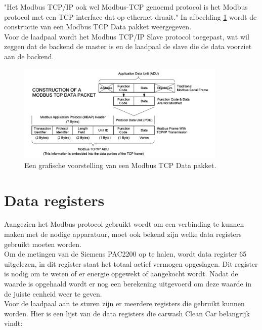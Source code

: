 "Het Modbus TCP/IP ook wel Modbus-TCP genoemd protocol is het Modbus protocol met een TCP interface dat op ethernet draait." \autocite{Acromag2005} In afbeelding \ref{fig:modbus-data-pakket} wordt de constructie van een Modbus TCP Data pakket weergegeven.\\

Voor de laadpaal wordt het Modbus TCP/IP Slave protocol toegepast, wat wil zeggen dat de backend de master is en de laadpaal de slave die de data voorziet aan de backend.

\begin{figure}[h]
    \includegraphics[width=10cm]{./graphics/Modbus-TCP-schema.png}
    \caption{Een grafische voorstelling van een Modbus TCP Data pakket. \autocite{Acromag2005}}
    \label{fig:modbus-data-pakket}
\end{figure}

\section{Data registers}
\label{sec:stand-van-zaken-dataregisters}

Aangezien het Modbus protocol gebruikt wordt om een verbinding te kunnen maken met de nodige apparatuur, moet ook bekend zijn welke data registers gebruikt moeten worden.\\

Om de metingen van de Siemens PAC2200 op te halen, wordt data register 65 uitgelezen, in dit register staat het totaal actief vermogen opgeslagen. Dit register is nodig om te weten of er energie opgewekt of aangekocht wordt. Nadat de waarde is opgehaald wordt er nog een berekening uitgevoerd om deze waarde in de juiste eenheid weer te geven.\\

Voor de laadpaal aan te sturen zijn er meerdere registers die gebruikt kunnen worden. Hier is een lijst van de data registers die carwash Clean Car belangrijk vindt:

